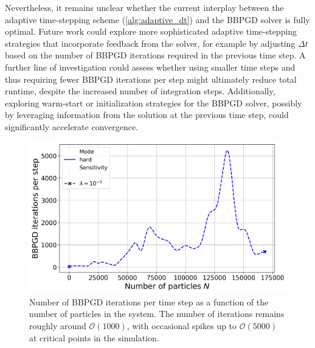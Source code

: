 \documentclass[conference]{IEEEtran}
\begin{document}
Nevertheless, it remains unclear whether the current interplay between the adaptive time-stepping scheme (\autoref{alg:adaptive_dt}) and the BBPGD solver is fully optimal. Future work could explore more sophisticated adaptive time-stepping strategies that incorporate feedback from the solver, for example by adjusting $\Delta t$ based on the number of BBPGD iterations required in the previous time step. A further line of investigation could assess whether using smaller time steps and thus requiring fewer BBPGD iterations per step might ultimately reduce total runtime, despite the increased number of integration steps. Additionally, exploring warm-start or initialization strategies for the BBPGD solver, possibly by leveraging information from the solution at the previous time step, could significantly accelerate convergence.

\begin{figure}[h]
    \centering
    \includegraphics[width=\linewidth]{figures/comparison_plots/bbpgd_num_particles_vs_bbpgd_steps.png}
    \caption{Number of BBPGD iterations per time step as a function of the number of particles in the system. The number of iterations remains roughly around $\mathcal{O}(1000)$, with occasional spikes up to $\mathcal{O}(5000)$ at critical points in the simulation.}
    \label{fig:bbpgd_iterations_per_step_vs_num_particles}
\end{figure}
\end{document}
